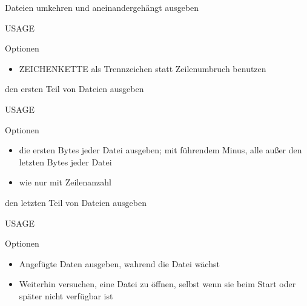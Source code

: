 \documentclass[aspectratio=43]{beamer}
\begin{document}
\begin{frame} 
	\begin{block}{} 
        Dateien umkehren und aneinandergehängt ausgeben
	\end{block}
	\begin{block}{USAGE} 
	\end{block}
	\begin{exampleblock}{Optionen} 
	\begin{itemize}
	\item {}  
	\newline ZEICHENKETTE als Trennzeichen statt Zeilenumbruch benutzen
	\end{itemize}
	\end{exampleblock}
\end{frame}

\begin{frame} 
	\begin{block}{} 
        den ersten Teil von Dateien ausgeben
	\end{block}
	\begin{block}{USAGE} 
	\end{block}
	\begin{exampleblock}{Optionen} 
	\begin{itemize}
	\item {} die ersten  Bytes jeder Datei ausgeben; mit führendem Minus, alle außer den letzten  Bytes jeder Datei	
	\item {} wie  nur mit Zeilenanzahl 
	\end{itemize}
	
	\end{exampleblock}
\end{frame}

\begin{frame} 
	\begin{block}{} 
        den letzten Teil von Dateien ausgeben
	\end{block}
	\begin{block}{USAGE} 
	\end{block}
	\begin{exampleblock}{Optionen} 
	\begin{itemize}
	\item {}  Angefügte Daten ausgeben,  wahrend  die  Datei  wächst	
	\item {}  Weiterhin  versuchen, eine Datei zu öffnen, selbst wenn sie beim
              Start oder später nicht verfügbar ist
	\end{itemize}
	
	\end{exampleblock}
\end{frame}
\end{document}
